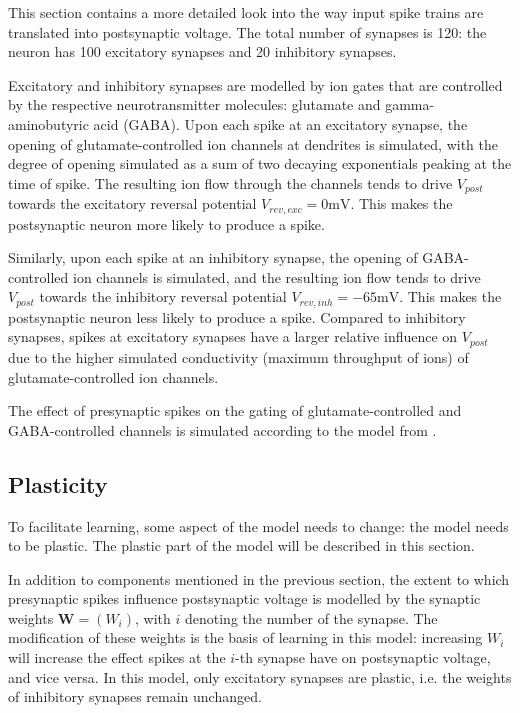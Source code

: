 \documentclass[a4paper,12pt]{report}
\theoremstyle{definition}
\begin{document}
This section contains a more detailed look into the way input spike trains are translated into postsynaptic voltage. The total number of synapses is 120: the neuron has 100 excitatory synapses and 20 inhibitory synapses.

Excitatory and inhibitory synapses are modelled by ion gates that are controlled by the respective neurotransmitter molecules: glutamate and gamma-aminobutyric acid (GABA). Upon each spike at an excitatory synapse, the opening of glutamate-controlled ion channels at dendrites is simulated, with the degree of opening simulated as a sum of two decaying exponentials peaking at the time of spike. The resulting ion flow through the channels tends to drive $V_{post}$ towards the excitatory reversal potential $V_{rev,exc}=0\mathrm{mV}$. This makes the postsynaptic neuron more likely to produce a spike.

Similarly, upon each spike at an inhibitory synapse, the opening of GABA-controlled ion channels is simulated, and the resulting ion flow tends to drive $V_{post}$ towards the inhibitory reversal potential $V_{rev,inh}=-65\mathrm{mV}$. This makes the postsynaptic neuron less likely to produce a spike. Compared to inhibitory synapses, spikes at excitatory synapses have a larger relative influence on $V_{post}$ due to the higher simulated conductivity (maximum throughput of ions) of glutamate-controlled ion channels.

The effect of presynaptic spikes on the gating of glutamate-controlled and GABA-controlled channels is simulated according to the model from \cite{borgers2008gamma}.



\subsection{Plasticity}
\label{subsec:plasticity}

To facilitate learning, some aspect of the model needs to change: the model needs to be plastic. The plastic part of the model will be described in this section.

In addition to components mentioned in the previous section, the extent to which presynaptic spikes influence postsynaptic voltage is modelled by the synaptic weights $\boldsymbol{W}=(W_i)$, with $i$ denoting the number of the synapse. The modification of these weights is the basis of learning in this model: increasing $W_i$ will increase the effect spikes at the $i$-th synapse have on postsynaptic voltage, and vice versa. In this model, only excitatory synapses are plastic, i.e. the weights of inhibitory synapses remain unchanged.
\end{document}
